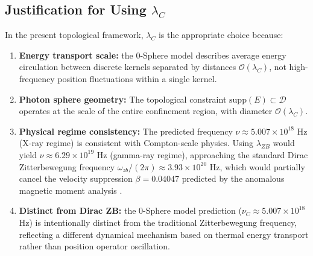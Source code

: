 \documentclass[%
 reprint,
 amsmath,amssymb,
 aps,
 prb,
]{revtex4-2}
\numberwithin{equation}{section}
\begin{document}
\subsection{Justification for Using $\lambda_C$}

In the present topological framework, $\lambda_C$ is the appropriate choice because:

\begin{enumerate}
\item \textbf{Energy transport scale:} the 0-Sphere model describes average energy circulation between discrete kernels separated by distances $\mathcal{O}(\lambda_C)$, not high-frequency position fluctuations within a single kernel.

\item \textbf{Photon sphere geometry:} The topological constraint $\mathrm{supp}(E) \subset \mathcal{D}$ operates at the scale of the entire confinement region, with diameter $\mathcal{O}(\lambda_C)$.

\item \textbf{Physical regime consistency:} The predicted frequency $\nu \approx 5.007 \times 10^{18}$ Hz (X-ray regime) is consistent with Compton-scale physics. Using $\lambda_{ZB}$ would yield $\nu \approx 6.29 \times 10^{19}$ Hz (gamma-ray regime), approaching the standard Dirac Zitterbewegung frequency $\omega_{zb}/(2\pi) \approx 3.93 \times 10^{20}$ Hz, which would partially cancel the velocity suppression $\beta = 0.04047$ predicted by the anomalous magnetic moment analysis \cite{hanamura17764997}.

\item \textbf{Distinct from Dirac ZB:} the 0-Sphere model prediction ($\nu_C \approx 5.007 \times 10^{18}$ Hz) is intentionally distinct from the traditional Zitterbewegung frequency, reflecting a different dynamical mechanism based on thermal energy transport rather than position operator oscillation.
\end{enumerate}
\end{document}
